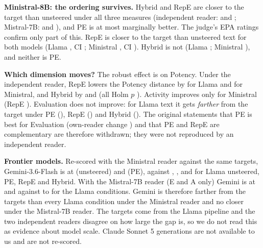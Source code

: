 \documentclass[letterpaper]{article} %
\begin{document}
\textbf{Ministral-8B: the ordering survives.} Hybrid and RepE are closer to the target than unsteered under all three measures (independent reader: \DeltaMinistralCrossHybrid{} and \DeltaMinistralCrossRepeonly; Mistral-7B: \DeltaMinistralMSevenbHybrid{} and \DeltaMinistralMSevenbRepeonly), and PE is at most marginally better. The judge's EPA ratings confirm only part of this. RepE is closer to the target than unsteered text for both models (Llama \JdEpaLlamaRepeonlyVsUnst, CI \JdEpaLlamaRepeonlyVsUnstCi; Ministral \JdEpaMinistralRepeonlyVsUnst, CI \JdEpaMinistralRepeonlyVsUnstCi). Hybrid is not (Llama \JdEpaLlamaHybridVsUnst; Ministral \JdEpaMinistralHybridVsUnst), and neither is PE.

\textbf{Which dimension moves?} The robust effect is on Potency. Under the independent reader, RepE lowers the Potency distance by \DeltaDimLlamaCrossRepeonlyP{} for Llama and \DeltaDimMinistralCrossRepeonlyP{} for Ministral, and Hybrid by \DeltaDimLlamaCrossHybridP{} and \DeltaDimMinistralCrossHybridP{} (all Holm $p$ \DeltaDimLlamaCrossHybridPP). Activity improves only for Ministral (RepE \DeltaDimMinistralCrossRepeonlyA). Evaluation does not improve: for Llama text it gets \emph{farther} from the target under PE (\DeltaDimLlamaCrossPeonlyE), RepE (\DeltaDimLlamaCrossRepeonlyE) and Hybrid (\DeltaDimLlamaCrossHybridE). The original statements that PE is best for Evaluation (own-reader change \DeltaDimLlamaOrigPeonlyE) and that PE and RepE are complementary are therefore withdrawn; they were not reproduced by an independent reader.

\textbf{Frontier models.} Re-scored with the Ministral reader against the same targets, Gemini-3.6-Flash is at \FrontierGeminiGeminiunsteered{} (unsteered) and \FrontierGeminiGeminipe{} (PE), against \FrontierLlamaThreeUnsteered{}, \FrontierLlamaThreePeonly{}, \FrontierLlamaThreeRepeonly{} and \FrontierLlamaThreeHybrid{} for Llama unsteered, PE, RepE and Hybrid. With the Mistral-7B reader (E and A only) Gemini is at \FrontierSevenGeminiGeminiunsteered{} and \FrontierSevenGeminiGeminipe{} against \FrontierSevenLlamaThreeUnsteered{} to \FrontierSevenLlamaThreeHybrid{} for the Llama conditions. Gemini is therefore farther from the targets than every Llama condition under the Ministral reader and no closer under the Mistral-7B reader. The targets come from the Llama pipeline and the two independent readers disagree on how large the gap is, so we do not read this as evidence about model scale. Claude Sonnet 5 generations are not available to us and are not re-scored.
\end{document}
